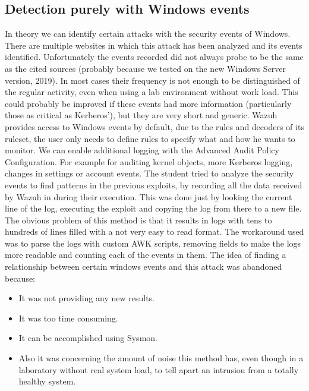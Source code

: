 \subsection{Detection purely with Windows events}
In theory we can identify certain attacks with the security events of Windows. There are multiple websites in which this attack has been analyzed and its events identified\cite{events_1}\cite{detection_events}.
\linej
Unfortunately the events recorded did not always probe to be the same as the cited sources (probably because we tested on the new Windows Server version, 2019).
In most cases their frequency is not enough to be distinguished of the regular activity, even when using a lab environment without work load.
This could probably be improved if these events had more information (particularly those as critical as Kerberos'), but they are very short and generic.
\linej
\linej
Wazuh provides access to Windows events by default, due to the rules and decoders of its ruleset\cite{wazuh_ossec_ruleset}, the user only needs to define rules to specify what and how he wants to monitor.
\linej
We can enable additional logging with the Advanced Audit Policy Configuration. For example for auditing kernel objects, more Kerberos logging, changes in settings or account events.
\linej
\linej
The student tried to analyze the security events to find patterns in the previous exploits, by recording all the data received by Wazuh in during their execution. This was done just by looking the current line of the log, executing the exploit and copying the log from there to a new file.
\linej
The obvious problem of this method is that it results in logs with tens to hundreds of lines filled with a not very easy to read format. The workaround used was to parse the logs with custom AWK scripts\cite{memoria_github}, removing fields to make the logs more readable and counting each of the events in them.
\linej
\linej
The idea of finding a relationship between certain windows events and this attack was abandoned because:
\begin{itemize}
	\item It was not providing any new results.
	\item It was too time consuming.
	\item It can be accomplished using Sysmon\cite{sysmon}\cite{sysmon_event_7_mimikatz}.
	\item Also it was concerning the amount of noise this method has, even though in a laboratory without real system load, to tell apart an intrusion from a totally healthy system.
\end{itemize}
